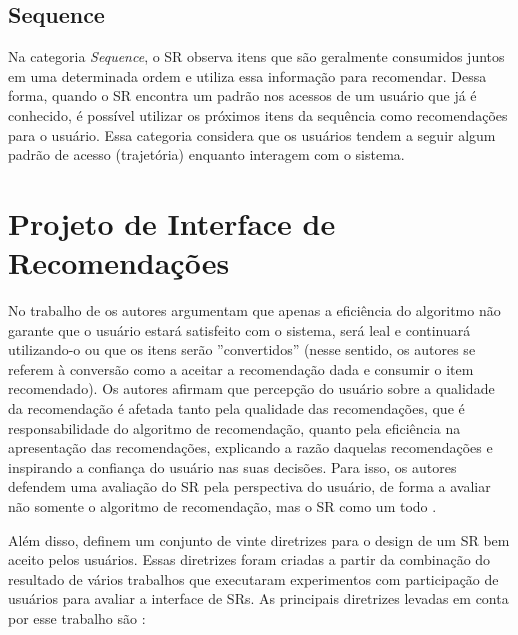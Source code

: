 \subsection{Sequence}\label{subsection:sequence}

Na categoria \textit{Sequence}, o SR observa itens que são geralmente consumidos juntos em uma determinada ordem e utiliza essa
informação para recomendar. Dessa forma, quando o SR encontra um padrão nos acessos de um usuário que já é conhecido,
é possível utilizar os próximos itens da sequência como recomendações para o usuário. Essa categoria considera que os usuários
tendem a seguir algum padrão de acesso (trajetória) enquanto interagem com o sistema.

\section{Projeto de Interface de Recomendações}\label{section:fundamentacao-apresentacao-recomendacao}

No trabalho de  os autores argumentam que apenas a eficiência do algoritmo não garante
que o usuário estará satisfeito com o sistema, será leal e continuará utilizando-o ou que os itens serão ''convertidos''
(nesse sentido, os autores se referem à conversão como a aceitar a recomendação dada e consumir o item recomendado).
Os autores afirmam que percepção do usuário sobre a qualidade da recomendação é afetada tanto pela
qualidade das recomendações, que é responsabilidade do algoritmo de recomendação, quanto pela eficiência na apresentação
das recomendações, explicando a razão daquelas recomendações e inspirando a confiança do usuário nas suas decisões.
Para isso, os autores defendem uma avaliação do SR pela perspectiva do usuário, de forma a avaliar não somente o algoritmo de
recomendação, mas o SR como um todo \cite{pu2012evaluating}.

Além disso,  definem um conjunto de vinte diretrizes para o design de um SR bem aceito
pelos usuários. Essas diretrizes foram criadas a partir da combinação do resultado de vários trabalhos que executaram
experimentos com participação de usuários para avaliar a interface de SRs. As principais
diretrizes levadas em conta por esse trabalho são \cite{pu2012evaluating}:

